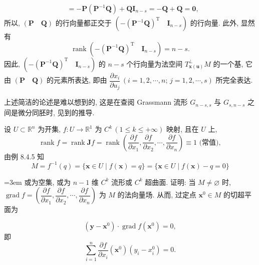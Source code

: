 \begin{example}
\begin{align*}
  &= -\boldsymbol{P}(\boldsymbol{P}^{-1}\boldsymbol{Q}) + \boldsymbol{Q}\boldsymbol{I}_{n-s} = -\boldsymbol{Q} + \boldsymbol{Q} = \boldsymbol{0},
\end{align*}
所以, $(\boldsymbol{P} \quad \boldsymbol{Q})$ 的行向量都正交于 $\left(-(\boldsymbol{P}^{-1}\boldsymbol{Q})^{\mathrm{T}} \quad \boldsymbol{I}_{n-s}\right)$ 的行向量. 此外, 显然有
\[
  \operatorname{rank}\left(-(\boldsymbol{P}^{-1}\boldsymbol{Q})^{\mathrm{T}} \quad \boldsymbol{I}_{n-s}\right) = n - s.
\]
因此, $\left(-(\boldsymbol{P}^{-1}\boldsymbol{Q})^{\mathrm{T}} \quad \boldsymbol{I}_{n-s}\right)$ 的 $n - s$ 个行向量为法空间 $T_{\boldsymbol{x}(\boldsymbol{u})}^{\perp}M$ 的一个基, 它由 $(\boldsymbol{P} \quad \boldsymbol{Q})$ 的元素所表达, 即由 $\dfrac{\partial x_{i}}{\partial u_{j}}\,(i = 1, 2, \cdots, n; \, j = 1, 2, \cdots, s)$ 所完全表达.
\end{example}

上述简洁的论述是难以想到的, 这是在查阅 Grassmann 流形 $G_{n-s,s}$ 与 $G_{s,n-s}$ 之间是微分同胚时, 见到的推导.

\begin{example}\label{ex:9.1.5}
设 $U \subset \mathbb{R}^n$ 为开集, $f\colon U \to \mathbb{R}^1$ 为 $C^k\,(1 \leqslant k \leqslant +\infty)$ 映射, 且在 $U$ 上,
\[
  \operatorname{rank} f = \operatorname{rank} \boldsymbol{J}f = \operatorname{rank}\left(\frac{\partial f}{\partial x_{1}}, \frac{\partial f}{\partial x_{2}}, \cdots, \frac{\partial f}{\partial x_{n}}\right) \equiv 1 \text{ (常值)},
\]
由例 8.4.5 知
\[
  M = f^{-1}(q) = \{\boldsymbol{x} \in U \mid f(\boldsymbol{x}) = q\} = \{\boldsymbol{x} \in U \mid f(\boldsymbol{x}) - q = 0\}
\]
{\emergencystretch=3em 或为空集, 或为 $n - 1$ 维 $C^{k}$ 流形或 $C^{k}$ 超曲面. 证明: 当 $M \neq \varnothing$ 时, $\operatorname{grad}f = \left(\dfrac{\partial f}{\partial x_{1}},\allowbreak \dfrac{\partial f}{\partial x_{2}},\allowbreak \cdots,\allowbreak \dfrac{\partial f}{\partial x_{n}}\right)$ 为 $M$ 的法向量场. 从而, 过定点 $\boldsymbol{x}^{0} \in M$ 的切超平面为\par}
\[
  (\boldsymbol{y} - \boldsymbol{x}^{0}) \cdot \operatorname{grad}f(\boldsymbol{x}^{0}) = 0,
\]
即
\[
  \sum_{i=1}^{n}\frac{\partial f}{\partial x_{i}}(\boldsymbol{x}^{0})(y_{i} - x_{i}^{0}) = 0.
\]
\end{example}

